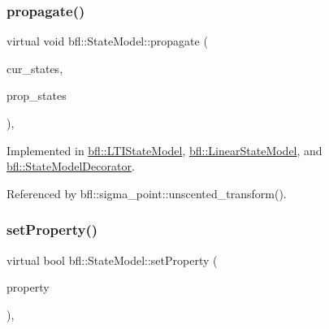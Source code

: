\mbox{\label{classbfl_1_1StateModel_a39cd8c8c5adbd623884583b4a7a7415c}} 
\subsubsection{\texorpdfstring{propagate()}{propagate()}}
{\footnotesize\ttfamily virtual void bfl\+::\+State\+Model\+::propagate (\begin{DoxyParamCaption}\item[{const Eigen\+::\+Ref$<$ const Eigen\+::\+Matrix\+Xd $>$ \&}]{cur\+\_\+states,  }\item[{Eigen\+::\+Ref$<$ Eigen\+::\+Matrix\+Xd $>$}]{prop\+\_\+states }\end{DoxyParamCaption})\hspace{0.3cm}{\ttfamily [pure virtual]}, {\ttfamily [inherited]}}



Implemented in \mbox{\hyperlink{classbfl_1_1LTIStateModel_a0a736ef66903c2e598f0b86892a716aa}{bfl\+::\+L\+T\+I\+State\+Model}}, \mbox{\hyperlink{classbfl_1_1LinearStateModel_a7823383ddc1ed709b9399c712997f512}{bfl\+::\+Linear\+State\+Model}}, and \mbox{\hyperlink{classbfl_1_1StateModelDecorator_a9548415d6445c58778eeeadf48ff2672}{bfl\+::\+State\+Model\+Decorator}}.



Referenced by bfl\+::sigma\+\_\+point\+::unscented\+\_\+transform().

\mbox{\label{classbfl_1_1StateModel_ac86dcdad8f0bbfab39a23e592779feaa}} 
\subsubsection{\texorpdfstring{set\+Property()}{setProperty()}}
{\footnotesize\ttfamily virtual bool bfl\+::\+State\+Model\+::set\+Property (\begin{DoxyParamCaption}\item[{const std\+::string \&}]{property }\end{DoxyParamCaption})\hspace{0.3cm}{\ttfamily [pure virtual]}, {\ttfamily [inherited]}}



